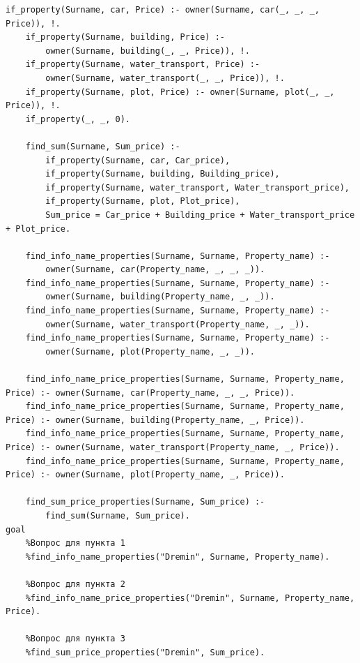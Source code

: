 \begin{lstlisting}[label=lst:code, basicstyle=\footnotesize, caption=Код программы]
	if_property(Surname, car, Price) :- owner(Surname, car(_, _, _, Price)), !.
	if_property(Surname, building, Price) :- 
		owner(Surname, building(_, _, Price)), !.
	if_property(Surname, water_transport, Price) :- 
		owner(Surname, water_transport(_, _, Price)), !.
	if_property(Surname, plot, Price) :- owner(Surname, plot(_, _, Price)), !.
	if_property(_, _, 0).
	
	find_sum(Surname, Sum_price) :- 
		if_property(Surname, car, Car_price),
		if_property(Surname, building, Building_price),
		if_property(Surname, water_transport, Water_transport_price),
		if_property(Surname, plot, Plot_price),
		Sum_price = Car_price + Building_price + Water_transport_price + Plot_price.  							  
	
	find_info_name_properties(Surname, Surname, Property_name) :- 
		owner(Surname, car(Property_name, _, _, _)).
	find_info_name_properties(Surname, Surname, Property_name) :- 
		owner(Surname, building(Property_name, _, _)).
	find_info_name_properties(Surname, Surname, Property_name) :-
		owner(Surname, water_transport(Property_name, _, _)).
	find_info_name_properties(Surname, Surname, Property_name) :-
		owner(Surname, plot(Property_name, _, _)).
	
	find_info_name_price_properties(Surname, Surname, Property_name, Price) :- owner(Surname, car(Property_name, _, _, Price)).
	find_info_name_price_properties(Surname, Surname, Property_name, Price) :- owner(Surname, building(Property_name, _, Price)).
	find_info_name_price_properties(Surname, Surname, Property_name, Price) :- owner(Surname, water_transport(Property_name, _, Price)).
	find_info_name_price_properties(Surname, Surname, Property_name, Price) :- owner(Surname, plot(Property_name, _, Price)).
	
	find_sum_price_properties(Surname, Sum_price) :-
		find_sum(Surname, Sum_price).								       
goal
	%Вопрос для пункта 1
	%find_info_name_properties("Dremin", Surname, Property_name).
	
	%Вопрос для пункта 2
	%find_info_name_price_properties("Dremin", Surname, Property_name, Price). 
	
	%Вопрос для пункта 3
	%find_sum_price_properties("Dremin", Sum_price). 
\end{lstlisting}

